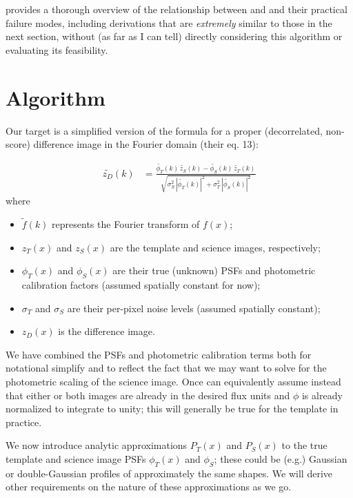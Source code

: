\documentclass[DM,authoryear,toc]{lsstdoc}
\newcommand{\ZOGY}{\citetalias{2016ApJ...830...27Z}}
\newcommand{\AL}{\citetalias{1998ApJ...503..325A}}
\begin{document}
 provides a thorough overview of the relationship between \ZOGY{} and \AL{} and their practical failure modes, including derivations that are \emph{extremely} similar to those in the next section, without (as far as I can tell) directly considering this algorithm or evaluating its feasibility.

\section{Algorithm}

Our target is a simplified version of the \ZOGY{} formula for a proper (decorrelated, non-score) difference image in the Fourier domain (their eq. 13):

\begin{align}
  \widetilde{z_D}(k) & = \frac{
    \widetilde{\phi_T}(k) \, \widetilde{z_S}(k)
    - \widetilde{\phi_S}(k) \, \widetilde{z_T}(k)
  }{
    \sqrt{
      \sigma_S^2 \, \left|\widetilde{\phi_T}(k)\right|^2
      + \sigma_T^2 \, \left|\widetilde{\phi_S}(k)\right|^2
    }
  }
\end{align}
where
\begin{itemize}
  \item $\widetilde{f}(k)$ represents the Fourier transform of $f(x)$;
  \item $z_T(x)$ and $z_S(x)$ are the template and science images, respectively;
  \item $\phi_T(x)$ and $\phi_S(x)$ are their true (unknown) PSFs and photometric calibration factors (assumed spatially constant for now);
  \item $\sigma_T$ and $\sigma_S$ are their per-pixel noise levels (assumed spatially constant);
  \item $z_D(x)$ is the difference image.
\end{itemize}
We have combined the PSFs and photometric calibration terms both for notational simplify and to reflect the fact that we may want to solve for the photometric scaling of the science image.
Once can equivalently assume instead that either or both images are already in the desired flux units and $\phi$ is already normalized to integrate to unity; this will generally be true for the template in practice.

We now introduce analytic approximations $P_T(x)$ and $P_S(x)$ to the true template and science image PSFs $\phi_T(x)$ and $\phi_S$; these could be (e.g.) Gaussian or double-Gaussian profiles of approximately the same shapes.
We will derive other requirements on the nature of these approximations as we go.
\end{document}
